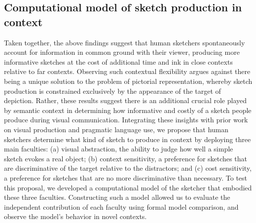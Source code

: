 \documentclass[9pt,twocolumn,twoside]{pnas-new}
\begin{document}




\subsection*{Computational model of sketch production in context}

Taken together, the above findings suggest that human sketchers spontaneously account for information in common ground with their viewer, producing more informative sketches at the cost of additional time and ink in close contexts relative to far contexts. 
Observing such contextual flexibility argues against there being a unique solution to the problem of pictorial representation, whereby sketch production is constrained exclusively by the appearance of the target of depiction. 
Rather, these results suggest there is an additional crucial role played by semantic context in determining how informative and costly of a sketch people produce during visual communication.  
Integrating these insights with prior work \cite{FanCommon2018,goodman2016pragmatic} on visual production and pragmatic language use, we propose that human sketchers determine what kind of sketch to produce in context by deploying three main faculties: (a) visual abstraction, the ability to judge how well a simple sketch evokes a real object; (b) context sensitivity, a preference for sketches that are discriminative of the target relative to the distractors; and (c) cost sensitivity, a preference for sketches that are no more discriminative than necessary. 
To test this proposal, we developed a computational model of the sketcher that embodied these three faculties. 
Constructing such a model allowed us to evaluate the independent contribution of each faculty using formal model comparison, and observe the model's behavior in novel contexts.
\end{document}
